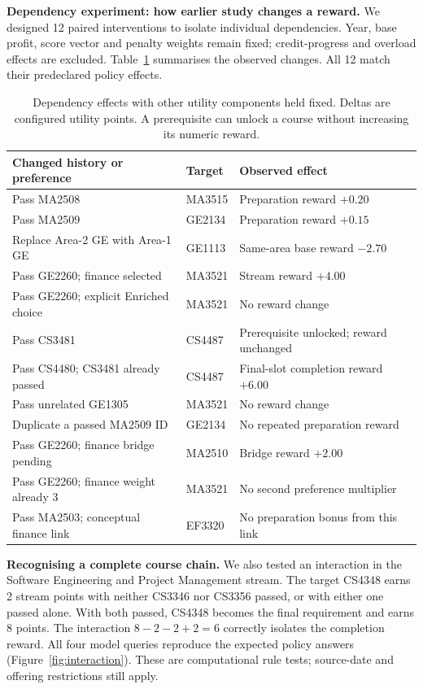 \documentclass{article}
\begin{document}
\textbf{Dependency experiment: how earlier study changes a reward.} We designed 12 paired interventions to isolate individual dependencies. Year, base profit, score vector and penalty weights remain fixed; credit-progress and overload effects are excluded. Table~\ref{tab:dependency} summarises the observed changes. All 12 match their predeclared policy effects.

\begin{table}[H]
\centering\small
\caption{Dependency effects with other utility components held fixed. Deltas are configured utility points. A prerequisite can unlock a course without increasing its numeric reward.}
\begin{tabular}{p{2.2in}p{0.65in}p{2.15in}}
\toprule
Changed history or preference & Target & Observed effect\\
\midrule
Pass MA2508 & MA3515 & Preparation reward $+0.20$\\
Pass MA2509 & GE2134 & Preparation reward $+0.15$\\
Replace Area-2 GE with Area-1 GE & GE1113 & Same-area base reward $-2.70$\\
Pass GE2260; finance selected & MA3521 & Stream reward $+4.00$\\
Pass GE2260; explicit Enriched choice & MA3521 & No reward change\\
Pass CS3481 & CS4487 & Prerequisite unlocked; reward unchanged\\
Pass CS4480; CS3481 already passed & CS4487 & Final-slot completion reward $+6.00$\\
Pass unrelated GE1305 & MA3521 & No reward change\\
Duplicate a passed MA2509 ID & GE2134 & No repeated preparation reward\\
Pass GE2260; finance bridge pending & MA2510 & Bridge reward $+2.00$\\
Pass GE2260; finance weight already 3 & MA3521 & No second preference multiplier\\
Pass MA2503; conceptual finance link & EF3320 & No preparation bonus from this link\\
\bottomrule
\end{tabular}
\label{tab:dependency}
\end{table}

\newpage
\textbf{Recognising a complete course chain.} We also tested an interaction in the Software Engineering and Project Management stream. The target CS4348 earns 2 stream points with neither CS3346 nor CS3356 passed, or with either one passed alone. With both passed, CS4348 becomes the final requirement and earns 8 points. The interaction $8-2-2+2=6$ correctly isolates the completion reward. All four model queries reproduce the expected policy answers (Figure~\ref{fig:interaction}). These are computational rule tests; source-date and offering restrictions still apply.
\end{document}

